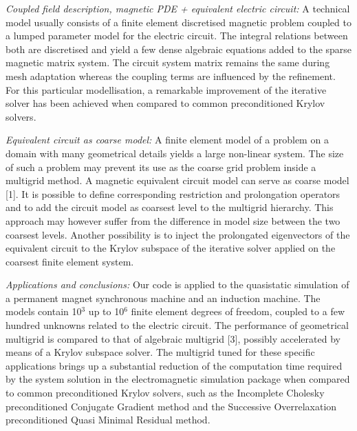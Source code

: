 \documentclass[11pt]{article}
\begin{document}
{\em 
Coupled field description, magnetic PDE + equivalent electric circuit:
}
 \newline 
A technical model usually consists of a finite element discretised magnetic problem coupled to a lumped parameter model for the electric circuit. The integral relations between both are discretised and yield a few dense algebraic equations added to the sparse magnetic matrix system. The circuit system matrix remains the same during mesh adaptation whereas the coupling terms are influenced by the refinement. For this particular modellisation, a remarkable improvement of the iterative solver has been achieved when compared to common preconditioned Krylov solvers.
 \newline 




{\em 
Equivalent circuit as coarse model:
}
 \newline 
A finite element model of a problem on a domain with many geometrical details yields a large non-linear system. The size of such a problem may prevent its use as the coarse grid problem inside a multigrid method. A  magnetic equivalent circuit model can serve as coarse model [1]. It is possible to define corresponding restriction and prolongation operators and to add the circuit model as coarsest level to the multigrid hierarchy. This approach may however suffer from the difference in model size between the two coarsest levels. Another possibility is to inject the prolongated eigenvectors of the equivalent circuit to the Krylov subspace of the iterative solver applied on the coarsest finite element system.
 \newline 




{\em 
Applications and conclusions:
}
 \newline 
Our code is applied to the quasistatic simulation of a permanent magnet synchronous machine and an induction machine. The models contain 10$^3$ up to 10$^6$ finite element degrees of freedom, coupled to a few hundred unknowns related to the electric circuit. The performance of geometrical multigrid is compared to that of algebraic multigrid [3], possibly accelerated by means of a Krylov subspace solver. The multigrid tuned for these specific applications brings up a substantial reduction of the computation time required by the system solution in the electromagnetic simulation package when compared to common preconditioned Krylov solvers, such as the Incomplete Cholesky preconditioned Conjugate Gradient method and the Successive Overrelaxation preconditioned Quasi Minimal Residual method.
 \newline 
\end{document}
